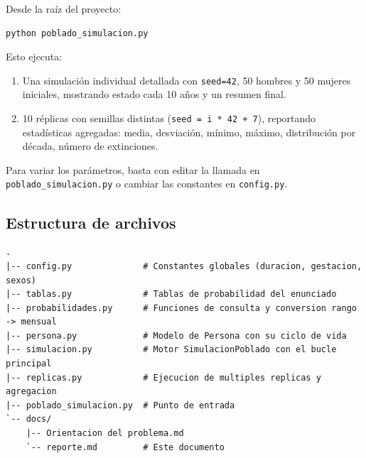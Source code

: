 \documentclass[12pt,a4paper]{article}
\begin{document}
Desde la raíz del proyecto:

\begin{lstlisting}
python poblado_simulacion.py
\end{lstlisting}

Esto ejecuta:

\begin{enumerate}
    \item Una simulación individual detallada con \texttt{seed=42}, 50 hombres y 50 mujeres iniciales, mostrando estado cada 10 años y un resumen final.
    \item 10 réplicas con semillas distintas (\texttt{seed = i * 42 + 7}), reportando estadísticas agregadas: media, desviación, mínimo, máximo, distribución por década, número de extinciones.
\end{enumerate}

Para variar los parámetros, basta con editar la llamada en \texttt{poblado\_simulacion.py} o cambiar las constantes en \texttt{config.py}.

\subsection{Estructura de archivos}

\begin{lstlisting}
.
|-- config.py              # Constantes globales (duracion, gestacion, sexos)
|-- tablas.py              # Tablas de probabilidad del enunciado
|-- probabilidades.py      # Funciones de consulta y conversion rango -> mensual
|-- persona.py             # Modelo de Persona con su ciclo de vida
|-- simulacion.py          # Motor SimulacionPoblado con el bucle principal
|-- replicas.py            # Ejecucion de multiples replicas y agregacion
|-- poblado_simulacion.py  # Punto de entrada
`-- docs/
    |-- Orientacion del problema.md
    `-- reporte.md         # Este documento
\end{lstlisting}
\end{document}
